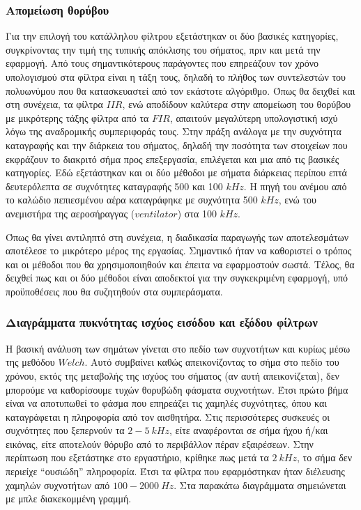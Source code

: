 \documentclass[breaklines=true, 12pt]{article}
\begin{document}
{{{\subsubsection{Απομείωση θορύβου}
\label{sec:org08a97eb}
Για την επιλογή του κατάλληλου φίλτρου εξετάστηκαν οι δύο βασικές
κατηγορίες, συγκρίνοντας την τιμή της τυπικής απόκλισης του σήματος, πριν
και μετά την εφαρμογή.  Από τους σημαντικότερους παράγοντες
που επηρεάζουν τον χρόνο υπολογισμού στα φίλτρα είναι η τάξη τους, δηλαδή
το πλήθος των συντελεστών του πολυωνύμου που θα κατασκευαστεί από τον
εκάστοτε αλγόριθμο. Όπως θα δειχθεί και στη συνέχεια, τα φίλτρα \(IIR\), ενώ
αποδίδουν καλύτερα στην απομείωση του θορύβου με μικρότερης τάξης φίλτρα
από τα \(FIR\), απαιτούν μεγαλύτερη υπολογιστική ισχύ λόγω της αναδρομικής
συμπεριφοράς τους. Στην πράξη ανάλογα με την συχνότητα καταγραφής και
την διάρκεια του σήματος, δηλαδή την ποσότητα των στοιχείων που εκφράζουν
το διακριτό σήμα προς επεξεργασία, επιλέγεται και μια από τις βασικές
κατηγορίες. Εδώ εξετάστηκαν και οι δύο μέθοδοι με σήματα διάρκειας περίπου
επτά δευτερόλεπτα σε συχνότητες καταγραφής 500 και 100 \(kHz\). Η πηγή του
ανέμου από το καλώδιο πεπιεσμένου αέρα καταγράφηκε με συχνότητα 500 \(kHz\),
ενώ του ανεμιστήρα της αεροσήραγγας (\textbf{\(ventilator\)}) στα 100 \(kHz\).

Όπως θα γίνει αντιληπτό στη συνέχεια, η διαδικασία παραγωγής των αποτελεσμάτων
αποτέλεσε το μικρότερο μέρος της εργασίας. Σημαντικό ήταν να καθοριστεί ο
τρόπος και οι μέθοδοι που θα χρησιμοποιηθούν και έπειτα να εφαρμοστούν
σωστά. Τέλος, θα δειχθεί πως και οι δύο μέθοδοι είναι αποδεκτοί για την
συγκεκριμένη εφαρμογή, υπό προϋποθέσεις που θα συζητηθούν στα συμπεράσματα.
\subsubsection{Διαγράμματα πυκνότητας ισχύος εισόδου και εξόδου φίλτρων}
\label{sec:org8e34365}
Η βασική ανάλυση των σημάτων γίνεται στο πεδίο των συχνοτήτων και κυρίως
μέσω της μεθόδου \(Welch\). Αυτό συμβαίνει
καθώς απεικονίζοντας το σήμα στο πεδίο του χρόνου, εκτός της μεταβολής της
ισχύος του σήματος (αν αυτή απεικονίζεται), δεν μπορούμε να καθορίσουμε
τυχών θορυβώδη φάσματα συχνοτήτων. Έτσι πρώτο βήμα είναι να αποτυπωθεί το
φάσμα που επηρεάζει τις χαμηλές συχνότητες, όπου και καταγράφεται η
πληροφορία από τον αισθητήρα. Στις περισσότερες συσκευές οι συχνότητες
που ξεπερνούν τα \(2-5\ kHz\), είτε αναφέρονται σε σήμα ήχου ή/και εικόνας,
είτε αποτελούν θόρυβο από το περιβάλλον πέραν εξαιρέσεων. Στην περίπτωση
που εξετάστηκε στο εργαστήριο, κρίθηκε πως μετά τα \(2\ kHz\), το σήμα δεν
περιείχε “ουσιώδη” πληροφορία. Έτσι τα φίλτρα που εφαρμόστηκαν ήταν διέλευσης
χαμηλών συχνοτήτων από \(100-2000\ Hz\).  Στα παρακάτω διαγράμματα σημειώνεται
με μπλε διακεκομμένη γραμμή.

}}}
\end{document}
